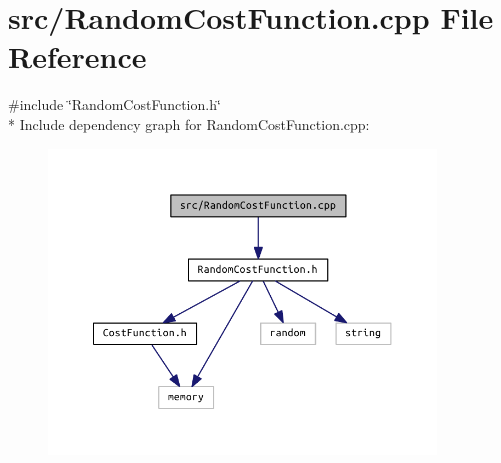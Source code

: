 \section{src/\+Random\+Cost\+Function.cpp File Reference}
\label{_random_cost_function_8cpp}
{\ttfamily \#include \char`\"{}Random\+Cost\+Function.\+h\char`\"{}}\\*
Include dependency graph for Random\+Cost\+Function.\+cpp\+:\nopagebreak
\begin{figure}[H]
\begin{center}
\leavevmode
\includegraphics[width=292pt]{_random_cost_function_8cpp__incl}
\end{center}
\end{figure}
